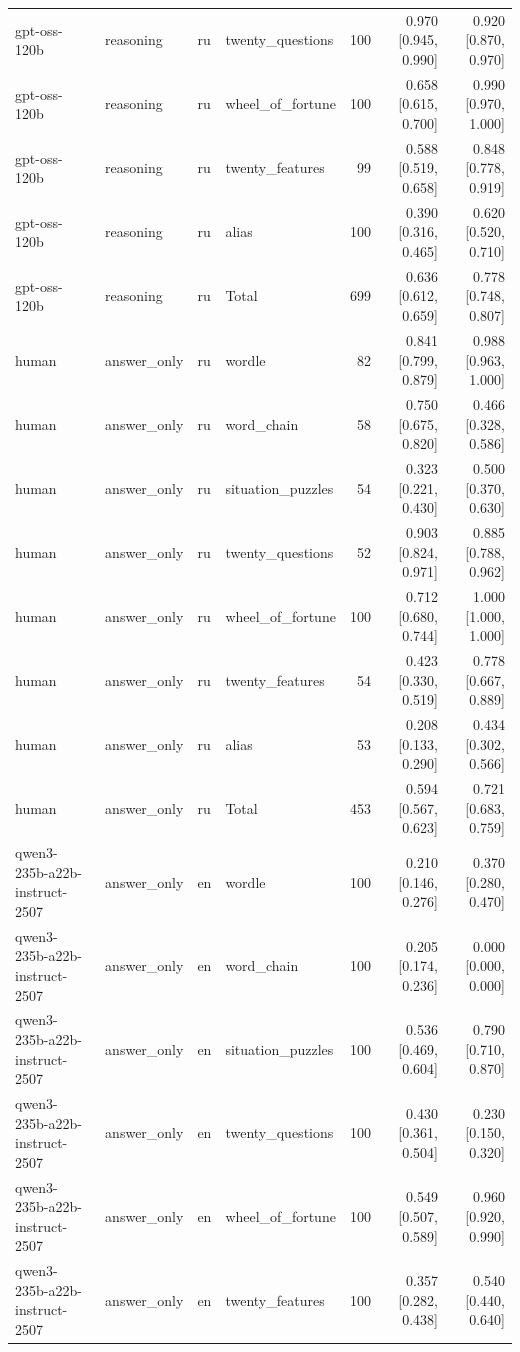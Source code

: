 \begin{longtable}{llllrrr}
gpt-oss-120b & reasoning & ru & twenty\_questions & 100 & 0.970 [0.945, 0.990] & 0.920 [0.870, 0.970] \\
gpt-oss-120b & reasoning & ru & wheel\_of\_fortune & 100 & 0.658 [0.615, 0.700] & 0.990 [0.970, 1.000] \\
gpt-oss-120b & reasoning & ru & twenty\_features & 99 & 0.588 [0.519, 0.658] & 0.848 [0.778, 0.919] \\
gpt-oss-120b & reasoning & ru & alias & 100 & 0.390 [0.316, 0.465] & 0.620 [0.520, 0.710] \\
gpt-oss-120b & reasoning & ru & Total & 699 & 0.636 [0.612, 0.659] & 0.778 [0.748, 0.807] \\
human & answer\_only & ru & wordle & 82 & 0.841 [0.799, 0.879] & 0.988 [0.963, 1.000] \\
human & answer\_only & ru & word\_chain & 58 & 0.750 [0.675, 0.820] & 0.466 [0.328, 0.586] \\
human & answer\_only & ru & situation\_puzzles & 54 & 0.323 [0.221, 0.430] & 0.500 [0.370, 0.630] \\
human & answer\_only & ru & twenty\_questions & 52 & 0.903 [0.824, 0.971] & 0.885 [0.788, 0.962] \\
human & answer\_only & ru & wheel\_of\_fortune & 100 & 0.712 [0.680, 0.744] & 1.000 [1.000, 1.000] \\
human & answer\_only & ru & twenty\_features & 54 & 0.423 [0.330, 0.519] & 0.778 [0.667, 0.889] \\
human & answer\_only & ru & alias & 53 & 0.208 [0.133, 0.290] & 0.434 [0.302, 0.566] \\
human & answer\_only & ru & Total & 453 & 0.594 [0.567, 0.623] & 0.721 [0.683, 0.759] \\
qwen3-235b-a22b-instruct-2507 & answer\_only & en & wordle & 100 & 0.210 [0.146, 0.276] & 0.370 [0.280, 0.470] \\
qwen3-235b-a22b-instruct-2507 & answer\_only & en & word\_chain & 100 & 0.205 [0.174, 0.236] & 0.000 [0.000, 0.000] \\
qwen3-235b-a22b-instruct-2507 & answer\_only & en & situation\_puzzles & 100 & 0.536 [0.469, 0.604] & 0.790 [0.710, 0.870] \\
qwen3-235b-a22b-instruct-2507 & answer\_only & en & twenty\_questions & 100 & 0.430 [0.361, 0.504] & 0.230 [0.150, 0.320] \\
qwen3-235b-a22b-instruct-2507 & answer\_only & en & wheel\_of\_fortune & 100 & 0.549 [0.507, 0.589] & 0.960 [0.920, 0.990] \\
qwen3-235b-a22b-instruct-2507 & answer\_only & en & twenty\_features & 100 & 0.357 [0.282, 0.438] & 0.540 [0.440, 0.640] \\

\end{longtable}
